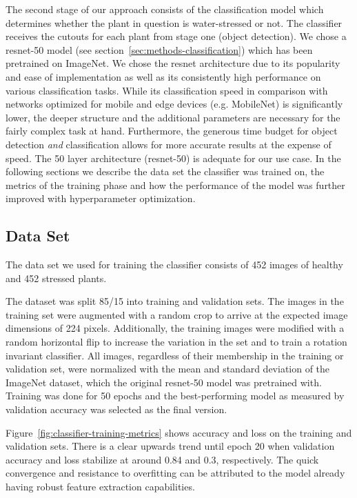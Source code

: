\documentclass[draft,final]{vutinfth} %
\begin{document}
The second stage of our approach consists of the classification model
which determines whether the plant in question is water-stressed or
not. The classifier receives the cutouts for each plant from stage one
(object detection). We chose a \gls{resnet}-50 model (see
section~\ref{sec:methods-classification}) which has been pretrained on
ImageNet. We chose the \gls{resnet} architecture due to its popularity
and ease of implementation as well as its consistently high
performance on various classification tasks. While its classification
speed in comparison with networks optimized for mobile and edge
devices (e.g. MobileNet) is significantly lower, the deeper structure
and the additional parameters are necessary for the fairly complex
task at hand. Furthermore, the generous time budget for object
detection \emph{and} classification allows for more accurate results
at the expense of speed. The \num{50} layer architecture
(\gls{resnet}-50) is adequate for our use case. In the following
sections we describe the data set the classifier was trained on, the
metrics of the training phase and how the performance of the model was
further improved with hyperparameter optimization.

\subsection{Data Set}
\label{ssec:class-train-dataset}

The data set we used for training the classifier consists of \num{452}
images of healthy and \num{452} stressed plants. 


The dataset was split 85/15 into training and validation sets. The
images in the training set were augmented with a random crop to arrive
at the expected image dimensions of \num{224} pixels. Additionally,
the training images were modified with a random horizontal flip to
increase the variation in the set and to train a rotation invariant
classifier. All images, regardless of their membership in the training
or validation set, were normalized with the mean and standard
deviation of the ImageNet \cite{deng2009} dataset, which the original
\gls{resnet}-50 model was pretrained with. Training was done for
\num{50} epochs and the best-performing model as measured by
validation accuracy was selected as the final version.

Figure~\ref{fig:classifier-training-metrics} shows accuracy and loss
on the training and validation sets. There is a clear upwards trend
until epoch \num{20} when validation accuracy and loss stabilize at
around \num{0.84} and \num{0.3}, respectively. The quick convergence
and resistance to overfitting can be attributed to the model already
having robust feature extraction capabilities.
\end{document}
